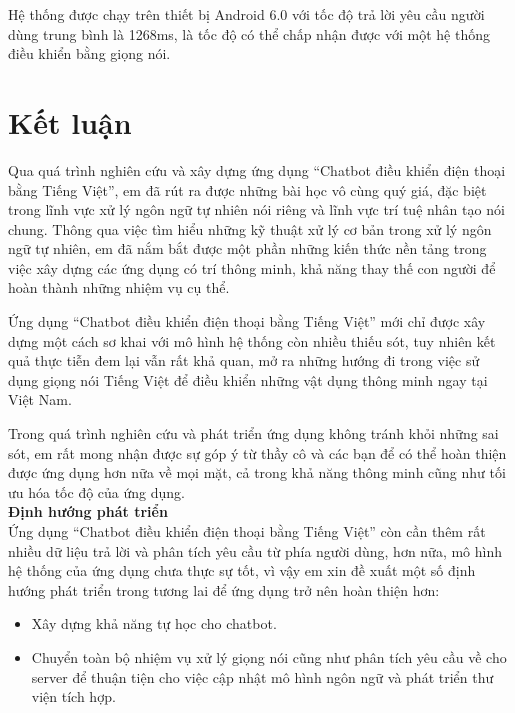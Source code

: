 \documentclass[12pt]{report}
\begin{document}
Hệ thống được chạy trên thiết bị Android 6.0 với tốc độ trả lời yêu cầu người dùng trung bình là 1268ms, là tốc độ có thể chấp nhận được với một hệ thống điều khiển bằng giọng nói.

\stopcontents[parts]

\chapter*{Kết luận}

Qua quá trình nghiên cứu và xây dựng ứng dụng ``Chatbot điều khiển điện thoại bằng Tiếng Việt'', em đã rút ra được những bài học vô cùng quý giá, đặc biệt trong lĩnh vực xử lý ngôn ngữ tự nhiên nói riêng và lĩnh vực trí tuệ nhân tạo nói chung. Thông qua việc tìm hiểu những kỹ thuật xử lý cơ bản trong xử lý ngôn ngữ tự nhiên, em đã nắm bắt được một phần những kiến thức nền tảng trong việc xây dựng các ứng dụng có trí thông minh, khả năng thay thế con người để hoàn thành những nhiệm vụ cụ thể.

Ứng dụng ``Chatbot điều khiển điện thoại bằng Tiếng Việt'' mới chỉ được xây dựng một cách sơ khai với mô hình hệ thống còn nhiều thiếu sót, tuy nhiên kết quả thực tiễn đem lại vẫn rất khả quan, mở ra những hướng đi trong việc sử dụng giọng nói Tiếng Việt để điều khiển những vật dụng thông minh ngay tại Việt Nam.

Trong quá trình nghiên cứu và phát triển ứng dụng không tránh khỏi những sai sót, em rất mong nhận được sự góp ý từ thầy cô và các bạn để có thể hoàn thiện được ứng dụng hơn nữa về mọi mặt, cả trong khả năng thông minh cũng như tối ưu hóa tốc độ của ứng dụng. \\[0.4cm]
\noindent \textbf{\large Định hướng phát triển\\[0.4cm]}
Ứng dụng ``Chatbot điều khiển điện thoại bằng Tiếng Việt'' còn cần thêm rất nhiều dữ liệu trả lời và phân tích yêu cầu từ phía người dùng, hơn nữa, mô hình hệ thống của ứng dụng chưa thực sự tốt, vì vậy em xin đề xuất một số định hướng phát triển trong tương lai để ứng dụng trở nên hoàn thiện hơn:

\begin{itemize}
	\item Xây dựng khả năng tự học cho chatbot.
	\item Chuyển toàn bộ nhiệm vụ xử lý giọng nói cũng như phân tích yêu cầu về cho server để thuận tiện cho việc cập nhật mô hình ngôn ngữ và phát triển thư viện tích hợp.
\end{itemize}
\end{document}
